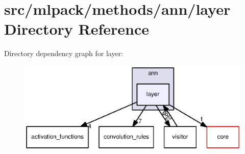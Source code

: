 \section{src/mlpack/methods/ann/layer Directory Reference}
\label{dir_104798ce316d01262d69b00f4c94ed15}
Directory dependency graph for layer\+:
\nopagebreak
\begin{figure}[H]
\begin{center}
\leavevmode
\includegraphics[width=350pt]{dir_104798ce316d01262d69b00f4c94ed15_dep}
\end{center}
\end{figure}
